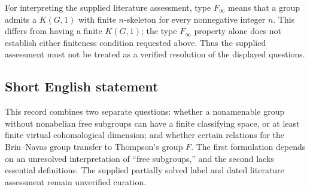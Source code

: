 \documentclass[11pt]{article}
\begin{document}
For interpreting the supplied literature assessment, type \(F_\infty\) means that a group admits a \(K(G,1)\) with finite \(n\)-skeleton for every nonnegative integer \(n\). This differs from having a finite \(K(G,1)\); the type \(F_\infty\) property alone does not establish either finiteness condition requested above. Thus the supplied assessment must not be treated as a verified resolution of the displayed questions.
\subsection{Short English statement}
This record combines two separate questions: whether a nonamenable group without nonabelian free subgroups can have a finite classifying space, or at least finite virtual cohomological dimension; and whether certain relations for the Brin--Navas group transfer to Thompson's group \(F\). The first formulation depends on an unresolved interpretation of ``free subgroups,'' and the second lacks essential definitions. The supplied partially solved label and dated literature assessment remain unverified curation.
\end{document}
